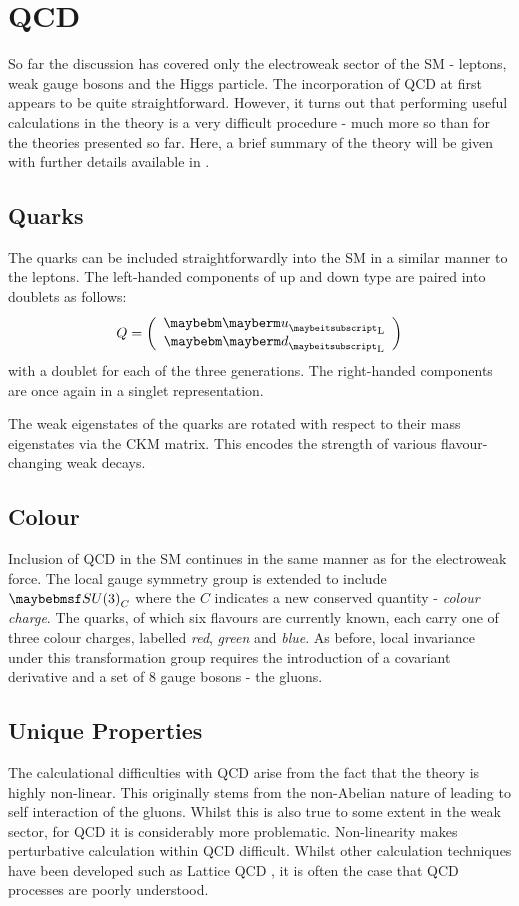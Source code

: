 \section{\acl{QCD}}
So far the discussion has covered only the electroweak sector of the \ac{SM} -
leptons, weak gauge bosons and the Higgs particle. The incorporation of
\acl{QCD} at first appears to be quite straightforward. However, it turns out
that performing useful calculations in the theory is a very difficult procedure
- much more so than for the theories presented so far. Here, a brief summary of
the theory will be given with further details available in \cite{pink_book}.

\subsection{Quarks}
The quarks can be included straightforwardly into the \ac{SM} in a similar
manner to the leptons. The left-handed components of up and down type are paired
into doublets as follows:
\begin{equation}
Q=\left(\begin{array}{c}\Pup_{\textrm{L}} \\ \Pdown_{\textrm{L}}\end{array}\right)
\end{equation}
with a doublet for each of the three generations. The right-handed components
are once again in a singlet representation.

The weak eigenstates of the quarks are rotated with respect to their mass
eigenstates via the \ac{CKM} matrix. This encodes the strength of various
flavour-changing weak decays.

\subsection{Colour}
Inclusion of \ac{QCD} in the \ac{SM} continues in the same manner as for the
electroweak force. The local gauge symmetry group is extended to include
$\SUthree_{C}$ where the $C$ indicates a new conserved quantity - \emph{colour
  charge}. The quarks, of which six flavours are currently known, each carry one
of three colour charges, labelled \emph{red}, \emph{green} and \emph{blue}. As
before, local invariance under this transformation group requires the
introduction of a covariant derivative and a set of 8 gauge bosons - the gluons.

\subsection{Unique Properties}
The calculational difficulties with \ac{QCD} arise from the fact that the theory
is highly non-linear. This originally stems from the non-Abelian nature of
\SUthree leading to self interaction of the gluons. Whilst this is also true to
some extent in the weak sector, for \ac{QCD} it is considerably more
problematic. Non-linearity makes perturbative calculation within \ac{QCD}
difficult. Whilst other calculation techniques have been developed such as
Lattice \ac{QCD} \cite{lattice_qcd}, it is often the case that \ac{QCD}
processes are poorly understood.

